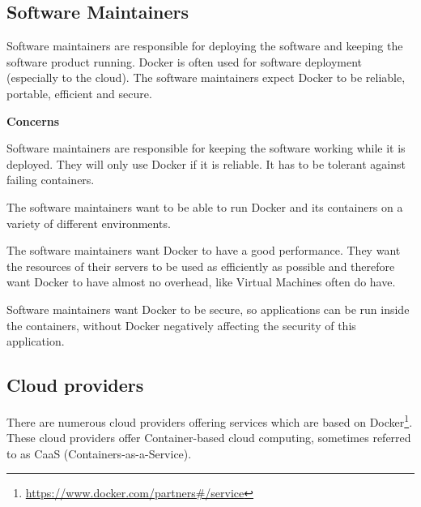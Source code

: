 \subsection*{Software Maintainers}
Software maintainers are responsible for deploying the software and keeping the software product running. Docker is often used for software deployment (especially to the cloud). %
The software maintainers expect Docker to be reliable, portable, efficient and secure.

\textbf{Concerns}
\begin{description}[labelwidth=6cm,labelindent=30pt,style=multiline,leftmargin=5.5cm,font=\normalfont\itshape]


\item[\textbf{Reliability}] Software maintainers are responsible for keeping the software working while it is deployed. They will only use Docker if it is reliable. It has to be tolerant against failing containers.

\item[\textbf{Portability}] The software maintainers want to be able to run Docker and its containers on a variety of different environments.

\item[\textbf{Performance efficiency}] The software maintainers want Docker to have a good performance. They want the resources of their servers to be used as efficiently as possible and therefore want Docker to have almost no overhead, like Virtual Machines often do have.


\item[\textbf{Security}] Software maintainers want Docker to be secure, so applications can be run inside the containers, without Docker negatively affecting the security of this application.


\end{description}



\subsection*{Cloud providers}
There are numerous cloud providers offering services which are based on Docker\footnote{\url{https://www.docker.com/partners\#/service}}. These cloud providers offer Container-based cloud computing, sometimes referred to as CaaS (Containers-as-a-Service).


